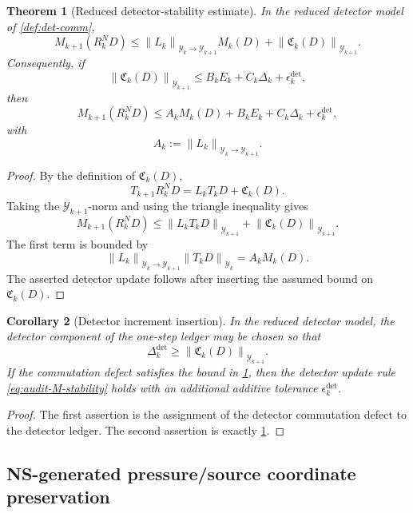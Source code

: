 \documentclass[11pt]{article}
\numberwithin{equation}{section}
\theoremstyle{plain}
\newtheorem{theorem}{Theorem}[section]
\newtheorem{corollary}[theorem]{Corollary}
\theoremstyle{definition}
\theoremstyle{remark}
\newcommand{\detc}{\mathrm{det}}
\newcommand{\norm}[1]{\left\lVert #1\right\rVert}
\begin{document}
\begin{theorem}[Reduced detector-stability estimate]\label{thm:det-stability}
In the reduced detector model of \cref{def:det-comm},
\[
  M_{k+1}(R_k^ND)
  \le
  \norm{L_k}_{\mathcal Y_k\to\mathcal Y_{k+1}}M_k(D)
  +
  \norm{\mathfrak C_k(D)}_{\mathcal Y_{k+1}}.
\]
Consequently, if
\[
  \norm{\mathfrak C_k(D)}_{\mathcal Y_{k+1}}
  \le
  B_kE_k+C_k\Delta_k+\epsilon_k^{\detc},
\]
then
\[
  M_{k+1}(R_k^ND)
  \le
  A_kM_k(D)+B_kE_k+C_k\Delta_k+\epsilon_k^{\detc},
\]
with
\[
  A_k:=\norm{L_k}_{\mathcal Y_k\to\mathcal Y_{k+1}}.
\]
\end{theorem}

\begin{proof}
By the definition of \(\mathfrak C_k(D)\),
\[
  T_{k+1}R_k^ND=L_kT_kD+\mathfrak C_k(D).
\]
Taking the \(\mathcal Y_{k+1}\)-norm and using the triangle inequality gives
\[
  M_{k+1}(R_k^ND)
  \le
  \norm{L_kT_kD}_{\mathcal Y_{k+1}}
  +
  \norm{\mathfrak C_k(D)}_{\mathcal Y_{k+1}}.
\]
The first term is bounded by
\[
  \norm{L_k}_{\mathcal Y_k\to\mathcal Y_{k+1}}
  \norm{T_kD}_{\mathcal Y_k}
  =
  A_kM_k(D).
\]
The asserted detector update follows after inserting the assumed bound on
\(\mathfrak C_k(D)\).
\end{proof}

\begin{corollary}[Detector increment insertion]\label{cor:det-insertion}
In the reduced detector model, the detector component of the one-step ledger
may be chosen so that
\[
  \Delta_k^{\detc}
  \ge
  \norm{\mathfrak C_k(D)}_{\mathcal Y_{k+1}}.
\]
If the commutation defect satisfies the bound in
\cref{thm:det-stability}, then the detector update rule \eqref{eq:audit-M-stability}
holds with an additional additive tolerance \(\epsilon_k^{\detc}\).
\end{corollary}

\begin{proof}
The first assertion is the assignment of the detector commutation defect to
the detector ledger.  The second assertion is exactly
\cref{thm:det-stability}.
\end{proof}

\subsection{NS-generated pressure/source coordinate preservation}
\end{document}
